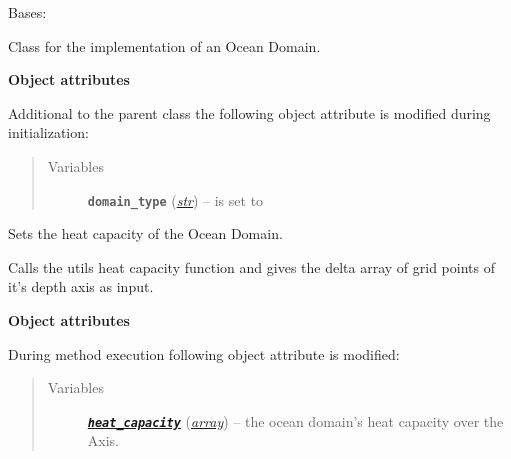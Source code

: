 \documentclass[letterpaper,10pt,english]{sphinxmanual}
\begin{document}

\begin{fulllineitems}
\label{api/climlab.domain:climlab.domain.domain.Ocean}
Bases: {\hyperref[api/climlab.domain:climlab.domain.domain._Domain]{\emph{}}}

Class for the implementation of an Ocean Domain.

\textbf{Object attributes}

Additional to the parent class {\hyperref[api/climlab.domain:climlab.domain.domain._Domain]{\emph{}}}
the following object attribute is modified during initialization:
\begin{quote}\begin{description}
\item[{Variables}] \leavevmode
\textbf{\texttt{domain\_type}} (\href{http://docs.python.org/2.7/library/functions.html\#str}{\emph{str}}) -- is set to 

\end{description}\end{quote}

\begin{fulllineitems}
\label{api/climlab.domain:climlab.domain.domain.Ocean.set_heat_capacity}
Sets the heat capacity of the Ocean Domain.

Calls the utils heat capacity function 
{\hyperref[api/climlab.utils:climlab.utils.heat_capacity.ocean]{\emph{}}} and gives the delta 
array of grid points of it's depth axis
 as input.

\textbf{Object attributes}

During method execution following object attribute is modified:
\begin{quote}\begin{description}
\item[{Variables}] \leavevmode
{\hyperref[api/climlab.utils:module-climlab.utils.heat_capacity]{\emph{\textbf{\texttt{heat\_capacity}}}}} (\href{http://docs.python.org/2.7/library/array.html\#module-array}{\emph{array}}) -- the ocean domain's heat capacity over 
the  Axis.

\end{description}\end{quote}

\end{fulllineitems}


\end{fulllineitems}
\end{document}
